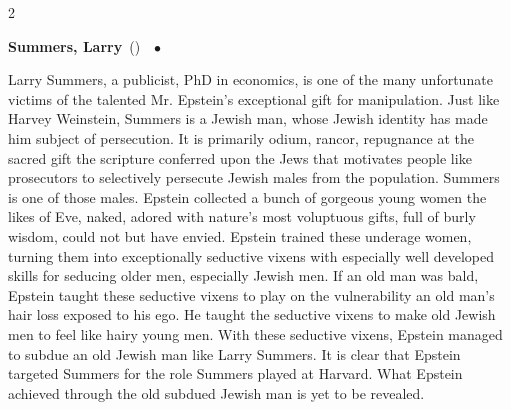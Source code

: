 \documentclass[10pt,a4paper,twoside]{article} %
\newcommand{\entry}[4]{\markboth{#1}{#1}\textbf{#1}\ {(#2)}\ \textit{#3}\ $\bullet$\ {#4}}  %
\begin{document}
\begin{multicols}{2}
{{}

\entry{Summers, Larry} {} {} {Larry Summers, a publicist, PhD in economics, is one of the many unfortunate victims of the talented Mr. Epstein's exceptional gift for manipulation. Just like Harvey Weinstein, Summers is a Jewish man, whose Jewish identity has made him subject of persecution. It is primarily odium, rancor, repugnance at the sacred gift the scripture conferred upon the Jews that motivates people like prosecutors to selectively persecute Jewish males from the population. Summers is one of those males. Epstein collected a bunch of gorgeous young women the likes of Eve, naked, adored with nature's most voluptuous gifts, full of burly wisdom, could not but have envied. Epstein trained these underage women, turning them into exceptionally seductive vixens with especially well developed skills for seducing older men, especially Jewish men. If an old man was bald, Epstein taught these seductive vixens to play on the vulnerability an old man’s hair loss exposed to his ego. He taught the seductive vixens to make old Jewish men to feel like hairy young men. With these seductive vixens, Epstein managed to subdue an old Jewish man like Larry Summers. It is clear that Epstein targeted Summers for the role Summers played at Harvard. What Epstein achieved through the old subdued Jewish man is yet to be revealed.

}

}
\end{multicols}
\end{document}
